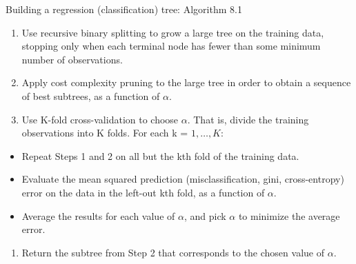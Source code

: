 \documentclass[10pt,ignorenonframetext,]{beamer}
\providecommand{\tightlist}{%
  \setlength{\itemsep}{0pt}\setlength{\parskip}{0pt}}
\begin{document}
\begin{frame}

\begin{block}{Building a regression (classification) tree: Algorithm
8.1}

\begin{enumerate}
\def\labelenumi{\arabic{enumi}.}
\tightlist
\item
  Use recursive binary splitting to grow a large tree on the training
  data, stopping only when each terminal node has fewer than some
  minimum number of observations.
\item
  Apply cost complexity pruning to the large tree in order to obtain a
  sequence of best subtrees, as a function of \(\alpha\).
\item
  Use K-fold cross-validation to choose \(\alpha\). That is, divide the
  training observations into K folds. For each k = \(1,\ldots, K\):
\end{enumerate}

\begin{itemize}
\tightlist
\item
  Repeat Steps 1 and 2 on all but the kth fold of the training data.
\item
  Evaluate the mean squared prediction (misclassification, gini,
  cross-entropy) error on the data in the left-out kth fold, as a
  function of \(\alpha\).
\item
  Average the results for each value of \(\alpha\), and pick \(\alpha\)
  to minimize the average error.
\end{itemize}

\begin{enumerate}
\def\labelenumi{\arabic{enumi}.}
\setcounter{enumi}{3}
\tightlist
\item
  Return the subtree from Step 2 that corresponds to the chosen value of
  \(\alpha\).
\end{enumerate}

\end{block}

\end{frame}
\end{document}
